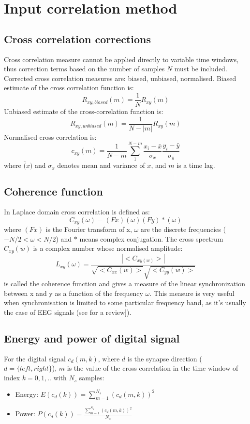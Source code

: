 
\section{Input correlation method}
\subsection{Cross correlation corrections}
\label{Appendix:crosscorr}
Cross correlation measure cannot be applied directly to variable time windows,
thus correction terms based on the number of samples $N$ must be included.
Corrected cross correlation measures are: biased, unbiased, normalised.
Biased estimate of the cross correlation function is:
\begin{equation}
 R_{xy,biased}(m)=\frac{1}{N} R_{xy}(m)
\end{equation}
Unbiased estimate of the cross-correlation function is:
\begin{equation}
 R_{xy,unbiased}(m)=\frac{1}{N-|m|} R_{xy}(m)
\end{equation}
Normalised cross correlation is:
\begin{equation}
c_{xy}(m)=\frac{1}{N-m} \sum_{1}^{N-m} \frac{x_{i}-\bar{x}}{\sigma_{x}} \frac{y_{i}-\bar{y}}{\sigma_{y}}
\end{equation}
where $\bar(x)$ and $\sigma_{x}$ denotes mean and variance of $x$, and $m$ is a time lag.
\subsection{Coherence function}
In Laplace domain cross correlation is defined as:
\begin{equation}
 C_{xy}(\omega)=(Fx)(\omega)(Fy)*(\omega)
\end{equation}
where $(Fx)$ is the Fourier  transform of x, $\omega$ are the discrete
frequencies ($-N/2<\omega<N/2$) and $*$ means complex conjugation.
The cross spectrum $C_{xy}(w)$ is a complex number whose normalised amplitude:
\begin{equation}
 L_{xy}(\omega)=\frac{|<C_{xy(w)}>|}{\sqrt{<C_{xx}(w)>}\sqrt{<C_{yy}(w)>}}
\end{equation}
is called the coherence function and gives a measure of the linear synchronization
 between x and y as a function of the frequency $\omega$. This measure
is very useful when synchronisation is limited to some particular frequency
band, as it's usually the case of EEG signals (see \citep{EEGxcorr} for a review]).
\subsection{Energy and power of digital signal}
\label{app:energy}
For the digital signal $c_{d}(m,k)$, where $d$ is the synapse direction ($d=\{left,right\}$), $m$
is the value of the cross correlation in the time window of index $k=0,1,..$ with $N_{s}$ samples:
\begin{itemize}
\item Energy: $E(c_{d}(k))=\sum_{m=1}^{N_{s}} (c_{d}(m,k))^2$
\item Power: $P(c_{d}(k))=\frac{\sum_{m=1}^{N_{s}} (c_{d}(m,k))^2}{N_{s}}$
\end{itemize}


